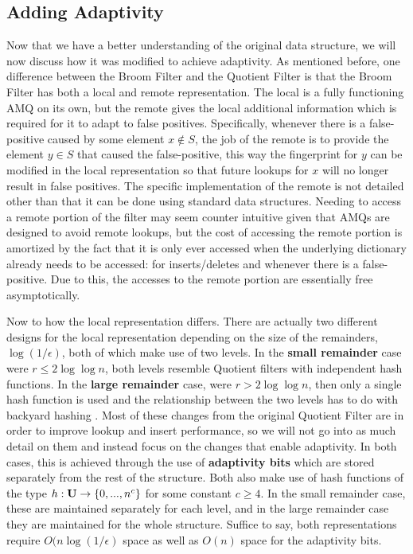 \documentclass[../paper.tex]{subfiles}
\begin{document}
\subsection{Adding Adaptivity} Now that we have a better understanding of the
original data structure, we will now discuss how it was modified to achieve
adaptivity.  As mentioned before, one difference between the Broom Filter and
the Quotient Filter is that the Broom Filter has both a local and remote
representation.  The local is a fully functioning AMQ on its own, but the
remote gives the local additional information which is required for it to adapt
to false positives.  Specifically, whenever there is a false-positive caused by
some element $x \notin S$, the job of the remote is to provide the element $y
\in S$ that caused the false-positive, this way the fingerprint for $y$ can be
modified in the local representation so that future lookups for $x$ will no
longer result in false positives.  The specific implementation of the remote is
not detailed other than that it can be done using standard data structures.
Needing to access a remote portion of the filter may seem counter intuitive
given that AMQs are designed to avoid remote lookups, but the cost of accessing
the remote portion is amortized by the fact that it is only ever accessed when
the underlying dictionary already needs to be accessed: for inserts/deletes and
whenever there is a false-positive.  Due to this, the accesses to the remote
portion are essentially free asymptotically.
	
    Now to how the local representation differs.  There are actually two
    different designs for the local representation depending on the size of the
    remainders, $\log(1/\epsilon)$, both of which make use of two levels.   In
    the {\bf small remainder} case were $r \leq 2 \log\log n$, both levels
    resemble Quotient filters with independent hash functions.  In the {\bf
    large remainder} case, were $ r > 2 \log\log n$, then only a single hash
    function is used and the relationship between the two levels has to do with
    backyard hashing \cite{backyard-hashing}.  Most of these changes from the
    original Quotient Filter are in order to improve lookup and insert
    performance, so we will not go into as much detail on them and instead
    focus on the changes that enable adaptivity.  In both cases, this is
    achieved through the use of {\bf adaptivity bits} which are stored
    separately from the rest of the structure.  Both also make use of hash
    functions of the type $h : {\bf U} \rightarrow \{0, ..., n^c\}$ for some
    constant $c \geq 4$.  In the small remainder case, these are maintained
    separately for each level, and in the large remainder case they are
    maintained for the whole structure.  Suffice to say, both representations
    require $O(n\log(1/\epsilon)$ space as well as $O(n)$ space for the
    adaptivity bits.  
	
\end{document}
